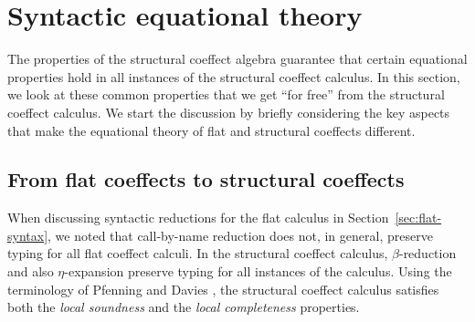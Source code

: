 %
%

\section{Syntactic equational theory}
\label{sec:struct-syntax}

The properties of the structural coeffect algebra guarantee that certain equational properties
hold in all instances of the structural coeffect calculus. In this section, we look at these common
properties that we get ``for free'' from the structural coeffect calculus. We start the discussion
by briefly considering the key aspects that make the equational theory of flat and structural
coeffects different.

\subsection{From flat coeffects to structural coeffects}
\label{sec:struct-syntax-intro}

When discussing syntactic reductions for the flat calculus in Section~\ref{sec:flat-syntax},
we noted that call-by-name reduction does not, in general, preserve typing  for all
flat coeffect calculi. In the structural coeffect calculus, $\beta$-reduction and also $\eta$-expansion
preserve typing for all instances of the calculus. Using the terminology of Pfenning and Davies
\cite{logic-modal-reconstruction}, the structural coeffect calculus satisfies both the \emph{local
soundness} and the \emph{local completeness} properties.

